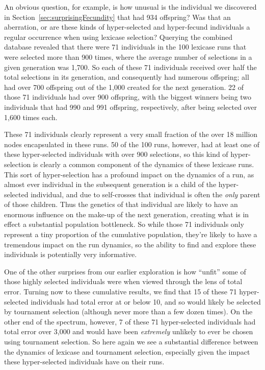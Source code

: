 An obvious question, for example, is how unusual is the individual we discovered in Section~\ref{sec:surprisingFecundity} 
that had 934 offspring? Was that an aberration, or are these kinds of hyper-selected and hyper-fecund individuals a
regular occurrence when using lexicase selection? Querying the combined database revealed that there were 71 individuals
in the 100 lexicase runs that were selected more than 900 times, where the average number of selections in a given 
generation was 1,700. So each of these 71 individuals received over half the total selections in its generation, and 
consequently had numerous offspring; all had over 700 offspring out of the 1,000 created for the next generation. 22 of
those 71 individuals had over 900 offspring, with the biggest winners being two individuals that had 990 and 991 
offspring, respectively, after being selected over 1,600 times each. 

These 71 individuals clearly represent a very small fraction of the over 18 million nodes encapsulated in these runs. 50 of
the 100 runs, however, had at least one of these hyper-selected individuals with over 900 selections, so this kind of 
hyper-selection is clearly a common component of the dynamics of these lexicase runs. This sort of hyper-selection 
has a profound impact on the dynamics of a run, as almost ever individual in the subsequent generation is a child of
the hyper-selected individual, and due to self-crosses that individual is often the \emph{only} parent of those children. Thus
the genetics of that individual are likely to have an enormous influence on the make-up of the next generation, creating
what is in effect a substantial population bottleneck. So while those 71 individuals only represent a tiny proportion of
the cumulative population, they're likely to have a tremendous impact on the run dynamics, so the ability to find and
explore these individuals is potentially very informative.

One of the other surprises from our earlier exploration is how ``unfit'' some of those highly selected individuals were when
viewed through the lens of total error. Turning now to these cumulative results, we find that 15 of these 71 hyper-selected
individuals had total error at or below 10, and so would likely be selected by tournament selection (although never more 
than a few dozen times). On the other end of the spectrum, however, 7 of these 71 hyper-selected individuals had total 
error over 3,000 and would have been \emph{extremely} unlikely to ever be chosen using tournament selection. So here
again we see a substantial difference between the dynamics of lexicase and tournament selection, especially given the
impact these hyper-selected individuals have on their runs.

